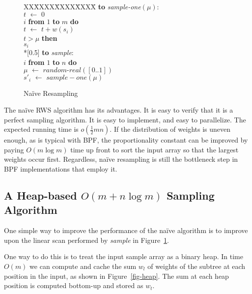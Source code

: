\documentclass[12pt]{article}
\newcommand{\asgn}{\,\,\leftarrow\,\,}
\newcommand{\newcode}{\\*[0.5\baselineskip]}
\begin{document}
  \begin{figure}
    \centering
    \begin{minipage}{0.6\textwidth}
      \begin{tabbing}
      XX\=XXXX\=XXXX\=XXXX\=\kill
      {\bf to} {\it sample-one}$(\mu)$: \\
      \>$t \asgn 0$ \\
       $i$ {\bf from} $1$ {\bf to} $m$ {\bf do} \\
      \>\>$t \asgn t + w(s_i)$ \\
      \> $t > \mu$ {\bf then} \\
      \>\> $s_i$ \newcode
      {\bf to} {\it sample}: \\
       $i$ {\bf from} $1$ {\bf to} $n$ {\bf do} \\
      \>\>$\mu \asgn \textit{random-real}([0..1])$ \\
      \>\>$s'_i \asgn sample-one(\mu)$
      \end{tabbing}
    \end{minipage}
    \caption{Na\"ive Resampling}\label{fig-omn}
  \end{figure}

  The na\"ive RWS algorithm has its advantages.  It is easy to
  verify that it is a perfect sampling algorithm.  It is
  easy to implement, and easy to parallelize.  The expected
  running time is $o(\frac{1}{2}mn)$.  If the distribution
  of weights is uneven enough, as is typical with BPF, the
  proportionality constant can be improved by paying $O(m
  \log m)$ time up front to sort the input array so that the
  largest weights occur first.  Regardless, na\"ive
  resampling is still the bottleneck step in BPF
  implementations that employ it.

\subsection{A Heap-based $O(m + n \log m)$ Sampling Algorithm}\label{sec-heap}

  One simple way to improve the performance of the na\"ive
  algorithm is to improve upon the linear scan performed by
  {\em sample} in Figure~\ref{fig-omn}.

  One way to do this is to treat the input sample array as a
  binary heap.  In time $O(m)$ we can compute and cache the
  sum $w_l$ of weights of the subtree at each position in
  the input, as shown in Figure~\ref{fig-heap}.  The sum at
  each heap position is computed bottom-up and stored as
  $w_t$.
\end{document}
